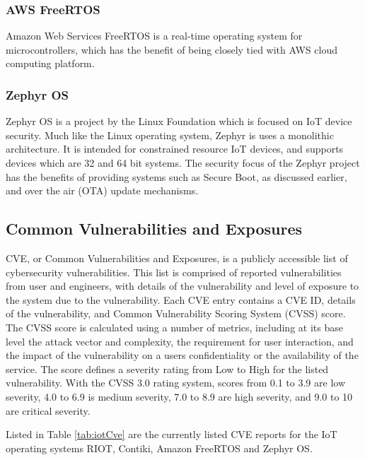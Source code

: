 \subsubsection{AWS FreeRTOS}

Amazon Web Services FreeRTOS is a real-time operating system for
microcontrollers, which has the benefit of being closely tied with AWS cloud
computing platform.

\subsubsection{Zephyr OS}

Zephyr OS is a project by the Linux Foundation which is focused on IoT device
security. Much like the Linux operating system, Zephyr is uses a monolithic
architecture. It is intended for constrained resource IoT devices, and supports
devices which are 32 and 64 bit systems. The security focus of the Zephyr
project has the benefits of providing systems such as Secure Boot, as discussed
earlier, and over the air (OTA) update mechanisms.

\subsection{Common Vulnerabilities and Exposures}

CVE, or Common Vulnerabilities and Exposures, is a publicly accessible list of
cybersecurity vulnerabilities\cite{cveHome}. This list is comprised of reported
vulnerabilities from user and engineers, with details of the vulnerability and
level of exposure to the system due to the vulnerability. Each CVE entry
contains a CVE ID, details of the vulnerability, and Common Vulnerability
Scoring System (CVSS) score. The CVSS score is calculated using a number of
metrics, including at its base level the attack vector and complexity, the
requirement for user interaction, and the impact of the vulnerability on a users
confidentiality or the availability of the service\cite{nvdCalculator}. The
score defines a severity rating from Low to High for the listed vulnerability.
With the CVSS 3.0 rating system, scores from 0.1 to 3.9 are low severity, 4.0 to
6.9 is medium severity, 7.0 to 8.9 are high severity, and 9.0 to 10 are critical
severity.

Listed in Table \ref{tab:iotCve} are the currently listed CVE reports for the IoT
operating systems RIOT, Contiki, Amazon FreeRTOS and Zephyr OS.

